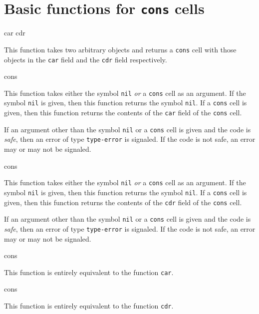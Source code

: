 \chapter{Basic functions for \texttt{cons} cells}
\label{chap-basic-cons-functions}

 {car cdr}

This function takes two arbitrary \lisp{} objects and returns a
\texttt{cons} cell with those objects in the \texttt{car} field and
the \texttt{cdr} field respectively.

 {cons}

This function takes either the symbol \texttt{nil} \emph{or} a
\texttt{cons} cell as an argument.  If the symbol \texttt{nil} is
given, then this function returns the symbol \texttt{nil}.  If a
\texttt{cons} cell is given, then this function returns the contents
of the \texttt{car} field of the \texttt{cons} cell.

If an argument other than the symbol \texttt{nil} or a \texttt{cons}
cell is given and the code is \emph{safe}, then an error of type
\texttt{type-error} is signaled.  If the code is not safe, an error
may or may not be signaled. 

 {cons}

This function takes either the symbol \texttt{nil} \emph{or} a
\texttt{cons} cell as an argument.  If the symbol \texttt{nil} is
given, then this function returns the symbol \texttt{nil}.  If a
\texttt{cons} cell is given, then this function returns the contents
of the \texttt{cdr} field of the \texttt{cons} cell.

If an argument other than the symbol \texttt{nil} or a \texttt{cons}
cell is given and the code is \emph{safe}, then an error of type
\texttt{type-error} is signaled.  If the code is not safe, an error
may or may not be signaled.

 {cons}

This function is entirely equivalent to the function \texttt{car}.

 {cons}

This function is entirely equivalent to the function \texttt{cdr}.

